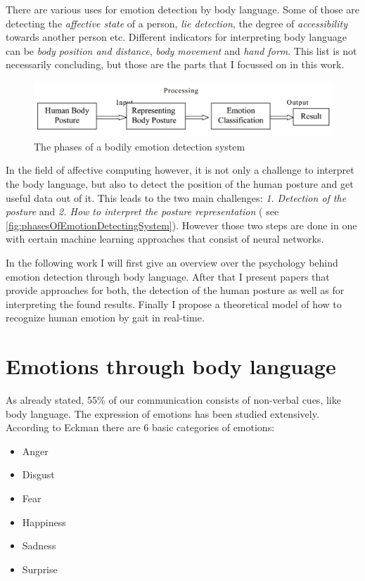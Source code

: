 \documentclass[conference]{IEEEtran}
\begin{document}
There are various uses for emotion detection by body language. Some of those are detecting the \emph{affective state} of a person, \emph{lie detection}, the degree of \emph{accessibility} towards another person etc. Different indicators for interpreting body language can be \emph{body position and distance}\cite{mccoll2012affect,mehrabian1969significance}, \emph{body movement}\cite{singhsignificance,karg2012pattern} and \emph{hand form}\cite{wang2007hand,triesch2001system}. This list is not necessarily concluding, but those are the parts that I focussed on in this work.

\begin{figure}[H]
\centering
   \includegraphics[width=\linewidth]{phasesOfEmotionDetectingSystem.jpg}
  \caption{The phases of a bodily emotion detection system\cite{singhsignificance}}
  \label{fig:phasesOfEmotionDetectingSystem}
\end{figure}


In the field of affective computing however, it is not only a challenge to interpret the body language, but also to detect the position of the human posture and get useful data out of it. This leads to the two main challenges: \emph{1. Detection of the posture} and \emph{2. How to interpret the posture representation} ( see \autoref{fig:phasesOfEmotionDetectingSystem}\cite{singhsignificance}). However those two steps are done in one with certain machine learning approaches that consist of neural networks\cite{schindler2008recognizing, kleinsmith2007recognizing, kleinsmith2005incremental}.

In the following work I will first give an overview over the psychology behind emotion detection through body language. After that I present papers that provide approaches for both, the detection of the human posture as well as for interpreting the found results. Finally I propose a theoretical model of how to recognize human emotion by gait in real-time. 

\section{Emotions through body language}
As already stated, 55\% of our communication consists of non-verbal cues, like body language. The expression of emotions has been studied extensively\cite{tomkins1962,ekmann1973universal,ekman1993facial,frijda1986emotions}. According to Eckman\cite{eckman2003emotions} there are 6 basic categories of emotions:
\begin{itemize}
\item{Anger}
\item{Disgust}
\item{Fear}
\item{Happiness}
\item{Sadness}
\item{Surprise}
\end{itemize}
\end{document}
